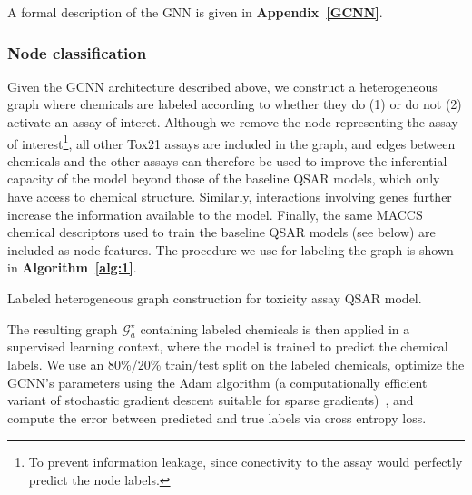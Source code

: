 \documentclass{ws-procs11x85}
\begin{document}
A formal description of the GNN is given in \textbf{Appendix~\ref{GCNN}}.

\subsubsection{Node classification}\label{methods-nc}
Given the GCNN architecture described above, we construct a heterogeneous graph where chemicals are labeled according to whether they do (1) or do not (2) activate an assay of interet.
Although we remove the node representing the assay of interest\footnote{To prevent information leakage, since conectivity to the assay would perfectly predict the node labels.}, all other Tox21 assays are included in the graph, and edges between chemicals and the other assays can therefore be used to improve the inferential capacity of the model beyond those of the baseline QSAR models, which only have access to chemical structure.
Similarly, interactions involving genes further increase the information available to the model.
Finally, the same MACCS chemical descriptors used to train the baseline QSAR models (see below) are included as node features.
The procedure we use for labeling the graph is shown in \textbf{Algorithm~\ref{alg:1}}.

\begin{algorithm}
\caption{Labeled heterogeneous graph construction for toxicity assay QSAR model.}\label{alg:1}
\begin{algorithmic}
   \Else
   \EndIf
\EndFor
{}
\end{algorithmic}
\end{algorithm}

The resulting graph $\mathcal{G}_a^\star$ containing labeled chemicals is then applied in a supervised learning context, where the model is trained to predict the chemical labels.
We use an 80\%/20\% train/test split on the labeled chemicals, optimize the GCNN's parameters using the Adam algorithm (a computationally efficient variant of stochastic gradient descent suitable for sparse gradients)~\cite{kingma2014adam}, and compute the error between predicted and true labels via cross entropy loss.
\end{document}
